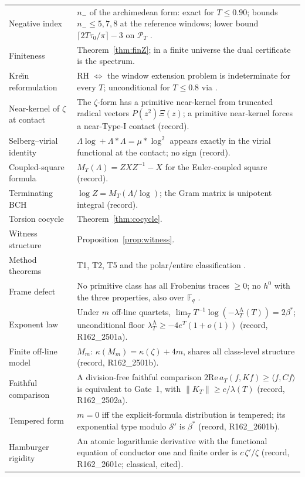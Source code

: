 \documentclass[11pt]{amsart}
\theoremstyle{definition}
\theoremstyle{remark}
\newcommand{\PT}{\mathcal P_T}
\newcommand{\lamA}{\lambda^{\mathrm A}_T}
\begin{document}
\begin{longtable}{@{}p{4.2cm}p{10.3cm}@{}}
Negative index & $n_-$ of the archimedean form: exact for $T\le0.90$; bounds $n_-\le5,7,8$ at the reference windows; lower bound $\lceil2T\tau_0/\pi\rceil-3$ on $\PT$ \cite[\S10.2]{Paper47}. \\
Finiteness & Theorem~\ref{thm:finZ}; in a finite universe the dual certificate is the spectrum. \\
Kre\u{\i}n reformulation & RH $\iff$ the window extension problem is indeterminate for every $T$; unconditional for $T\le0.8$ via \cite{Zhu2026} \cite[Thm.~8.5]{Paper47}. \\
Near-kernel of $\zeta$ at contact & The $\zeta$-form has a primitive near-kernel from truncated radical vectors $P(z^2)\Xi(z)$; a primitive near-kernel forces a near-Type-I contact (record). \\
Selberg--virial identity & $\Lambda\log+\Lambda*\Lambda=\mu*\log^2$ appears exactly in the virial functional at the contact; no sign (record). \\
Coupled-square formula & $M_T(\Lambda)=ZXZ^{-1}-X$ for the Euler-coupled square (record). \\
Terminating BCH & $\log Z=M_T(\Lambda/\log)$; the Gram matrix is unipotent integral (record). \\
Torsion cocycle & Theorem~\ref{thm:cocycle}. \\
Witness structure & Proposition~\ref{prop:witness}. \\
Method theorems & T1, T2, T5 and the polar/entire classification \cite[\S\S18, 27]{Paper46}. \\
Frame defect & No primitive class has all Frobenius traces $\ge0$; no $h^0$ with the three properties, also over $\mathbb F_q$ \cite{Paper46}. \\
Exponent law & Under $m$ off-line quartets, $\lim_TT^{-1}\log(-\lamA(T))=2\beta^*$; unconditional floor $\lamA\ge-4e^T(1+o(1))$ (record, R162\_2501a). \\
Finite off-line model & $M_m$: $\kappa(M_m)=\kappa(\zeta)+4m$, shares all class-level structure (record, R162\_2501b). \\
Faithful comparison & A division-free faithful comparison $2\mathrm{Re}\,a_T(f,Kf)\ge\langle f,Cf\rangle$ is equivalent to Gate~1, with $\|K_T\|\ge c/\lambda(T)$ (record, R162\_2502a). \\
Tempered form & $m=0$ iff the explicit-formula distribution is tempered; its exponential type modulo $\mathcal S'$ is $\beta^*$ (record, R162\_2601b). \\
Hamburger rigidity & An atomic logarithmic derivative with the functional equation of conductor one and finite order is $c\,\zeta'/\zeta$ (record, R162\_2601c; classical, cited). \\

\end{longtable}
\end{document}
